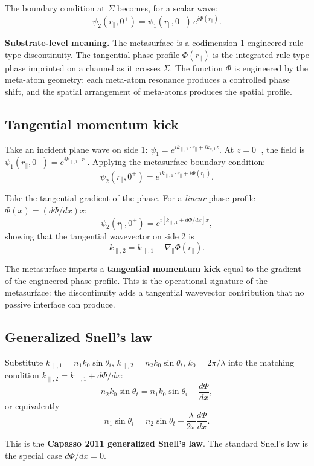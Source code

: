 \documentclass[11pt,a4paper]{article}
\begin{document}
The boundary condition at $\Sigma$ becomes, for a scalar wave:
\[
\boxed{\psi_2(r_\parallel, 0^+) = \psi_1(r_\parallel, 0^-)\,e^{i\Phi(r_\parallel)}.}
\]

\textbf{Substrate-level meaning.} The metasurface is a codimension-1 engineered rule-type discontinuity. The tangential phase profile $\Phi(r_\parallel)$ is the integrated rule-type phase imprinted on a channel as it crosses $\Sigma$. The function $\Phi$ is engineered by the meta-atom geometry: each meta-atom resonance produces a controlled phase shift, and the spatial arrangement of meta-atoms produces the spatial profile.

\subsection{Tangential momentum kick}

Take an incident plane wave on side 1: $\psi_1 = e^{i k_{\parallel,1}\cdot r_\parallel + i k_{z,1} z}$. At $z = 0^-$, the field is $\psi_1(r_\parallel, 0^-) = e^{i k_{\parallel,1}\cdot r_\parallel}$. Applying the metasurface boundary condition:
\[
\psi_2(r_\parallel, 0^+) = e^{i k_{\parallel,1}\cdot r_\parallel + i\Phi(r_\parallel)}.
\]

Take the tangential gradient of the phase. For a \emph{linear} phase profile $\Phi(x) = (d\Phi/dx)x$:
\[
\psi_2(r_\parallel, 0^+) = e^{i[k_{\parallel,1} + d\Phi/dx]x},
\]
showing that the tangential wavevector on side 2 is
\[
\boxed{k_{\parallel,2} = k_{\parallel,1} + \nabla_\parallel\Phi(r_\parallel).}
\]

The metasurface imparts a \textbf{tangential momentum kick} equal to the gradient of the engineered phase profile. This is the operational signature of the metasurface: the discontinuity adds a tangential wavevector contribution that no passive interface can produce.

\subsection{Generalized Snell's law}

Substitute $k_{\parallel,1} = n_1 k_0 \sin\theta_i$, $k_{\parallel,2} = n_2 k_0 \sin\theta_t$, $k_0 = 2\pi/\lambda$ into the matching condition $k_{\parallel,2} = k_{\parallel,1} + d\Phi/dx$:
\[
n_2 k_0 \sin\theta_t = n_1 k_0 \sin\theta_i + \frac{d\Phi}{dx},
\]
or equivalently
\[
\boxed{n_1 \sin\theta_i = n_2 \sin\theta_t + \frac{\lambda}{2\pi}\frac{d\Phi}{dx}.}
\]

This is the \textbf{Capasso 2011 generalized Snell's law}. The standard Snell's law is the special case $d\Phi/dx = 0$.
\end{document}
